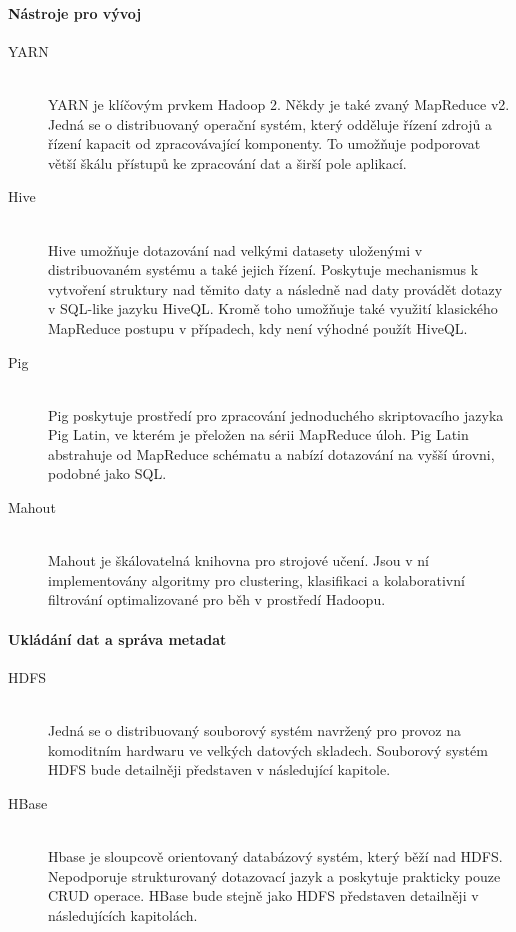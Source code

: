 \documentclass[thesis=M,czech]{FITthesis}[2012/06/26]
\begin{document}
\paragraph{Nástroje pro vývoj}
\begin{description}
\item[YARN] \hfill \\
YARN je klíčovým prvkem Hadoop 2. Někdy je také zvaný  MapReduce v2. Jedná se o distribuovaný operační systém, který odděluje řízení zdrojů a řízení kapacit od zpracovávající komponenty. To umožňuje  podporovat větší škálu přístupů ke zpracování dat a širší pole aplikací.

\item[Hive] \hfill \\
Hive umožňuje dotazování nad velkými datasety uloženými v distribuovaném systému a také jejich řízení. Poskytuje mechanismus k vytvoření struktury nad těmito daty a následně nad daty provádět dotazy v SQL-like  jazyku HiveQL. Kromě toho umožňuje také využití klasického MapReduce postupu v případech, kdy není výhodné použít HiveQL. 

\item[Pig] \hfill \\
Pig poskytuje prostředí pro zpracování jednoduchého skriptovacího jazyka Pig Latin, ve kterém je přeložen na sérii MapReduce úloh. Pig Latin abstrahuje od MapReduce schématu a nabízí dotazování na vyšší úrovni, podobné jako SQL.

\item[Mahout] \hfill \\
Mahout je škálovatelná knihovna pro strojové učení. Jsou v ní implementovány algoritmy pro clustering, klasifikaci a kolaborativní filtrování optimalizované pro běh v prostředí Hadoopu.
\end{description}
\paragraph{Ukládání dat a správa metadat}
\begin{description}
\item[HDFS] \hfill \\
Jedná se o distribuovaný souborový systém navržený  pro provoz na komoditním hardwaru ve velkých datových skladech. Souborový systém HDFS bude detailněji představen v následující kapitole.

\item[HBase] \hfill \\
Hbase je sloupcově orientovaný databázový systém, který běží nad HDFS. Nepodporuje strukturovaný dotazovací jazyk a poskytuje prakticky pouze CRUD operace. HBase bude stejně jako HDFS představen detailněji v následujících kapitolách.
\end{description}
\end{document}
